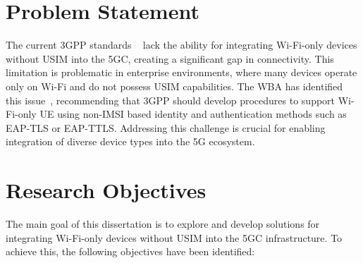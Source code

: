 \section{Problem Statement}

The current \ac{3GPP} standards ~\cite{33.501-p32} lack the ability for integrating Wi-Fi-only devices without \ac{USIM} into the \ac{5GC}, creating a significant gap in connectivity. This limitation is problematic in enterprise environments, where many devices operate only on Wi-Fi and do not possess \ac{USIM} capabilities. The \ac{WBA} has identified this issue~\cite{wba-04-2021-p59}, recommending that \ac{3GPP} should develop procedures to support Wi-Fi-only \ac{UE} using non-\acf{IMSI} based identity and authentication methods such as \acf{EAP-TLS} or \ac{EAP-TTLS}. Addressing this challenge is crucial for enabling integration of diverse device types into the \ac{5G} ecosystem.

\section{Research Objectives}

The main goal of this dissertation is to explore and develop solutions for integrating Wi-Fi-only devices without \ac{USIM} into the \ac{5GC} infrastructure. To achieve this, the following objectives have been identified:

